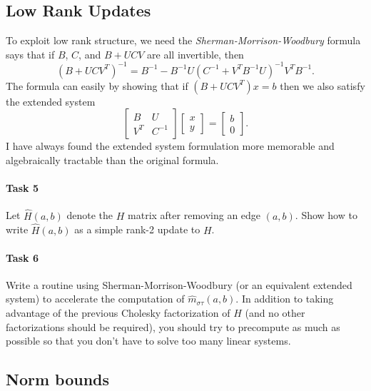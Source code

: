 \documentclass[12pt, leqno]{article}
\begin{document}
\subsection*{Low Rank Updates}

To exploit low rank structure, we need the
{\em Sherman-Morrison-Woodbury} formula says that if $B$, $C$, and
$B+UCV$ are all invertible, then
\[
  (B + UCV^T)^{-1} = B^{-1} - B^{-1} U (C^{-1} + V^T B^{-1} U)^{-1} V^T B^{-1}.
\]
The formula can easily by showing that if $(B+UCV^T) x = b$ then we
also satisfy the extended system
\[
\begin{bmatrix}
  B & U \\
  V^T & C^{-1}
\end{bmatrix}
\begin{bmatrix}
  x \\ y
\end{bmatrix} =
\begin{bmatrix}
  b \\ 0
\end{bmatrix}.
\]
I have always found the extended system formulation more memorable and
algebraically tractable than the original formula.

\paragraph*{Task 5}
Let $\hat{H}(a,b)$ denote the $H$ matrix after removing an edge
$(a,b)$.  Show how to write $\hat{H}(a,b)$ as a simple rank-2 update
to $H$.

\paragraph*{Task 6}
Write a routine using Sherman-Morrison-Woodbury (or an equivalent
extended system) to accelerate the computation of
$\hat{m}_{\sigma \tau}(a,b)$.  In
addition to taking advantage of the previous Cholesky factorization of
$H$ (and no other factorizations should be required), you should try
to precompute as much as possible so that you don't have to solve too
many linear systems.

\subsection*{Norm bounds}
\end{document}
